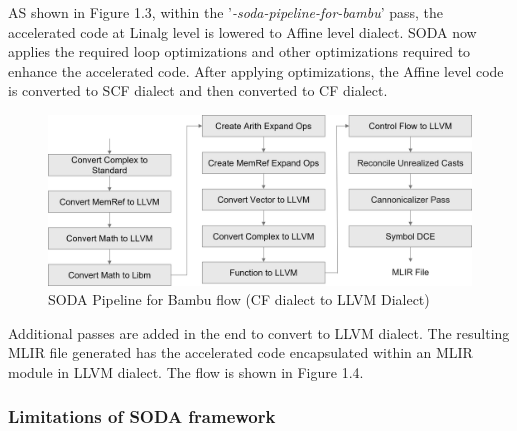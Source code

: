 AS shown in Figure 1.3, within the '\textit{-soda-pipeline-for-bambu}' pass, the accelerated code at Linalg level is lowered to Affine level dialect. SODA now applies the required loop optimizations and other optimizations required to enhance the accelerated code. After applying optimizations, the Affine level code is converted to SCF dialect and then converted to CF dialect.  

\begin{figure}
    \centering
    \includegraphics[width=0.9\linewidth]{figure//chapter1_intro/Fig 4 - Pipeline for Bambu 2.png}
    \caption{SODA Pipeline for Bambu flow (CF dialect to LLVM Dialect)}
    \label{fig:1.4)}
\end{figure}

Additional passes are added in the end to convert to LLVM dialect. The resulting MLIR file generated has the accelerated code encapsulated within an MLIR module in LLVM dialect. The flow is shown in Figure 1.4.

\subsubsection{Limitations of SODA framework}

